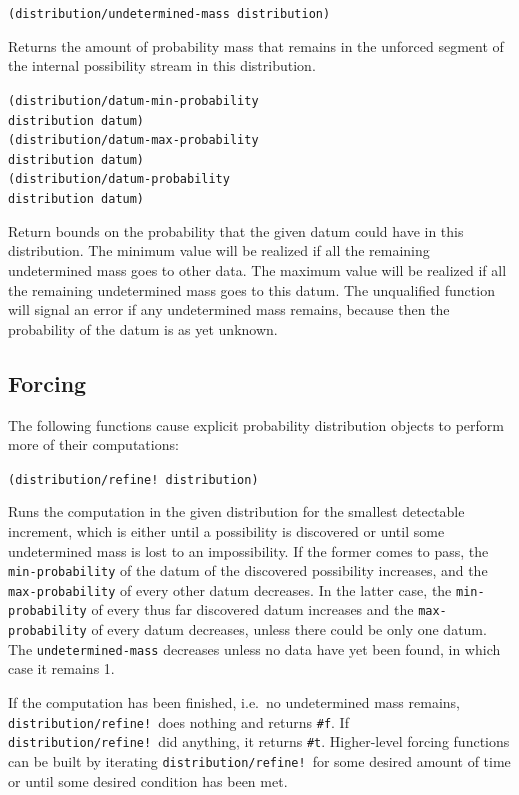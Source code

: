\documentclass[10pt]{sigplanconf}
\newcommand{\code}[1]{\texttt{#1}}
\newenvironment{documentation}[1]{\vspace{5pt} \noindent \texttt{#1} \nopagebreak \begin{list}{}{\leftmargin 0.7cm}\item}{\end{list}}
\begin{document}
\begin{documentation}{(distribution/undetermined-mass distribution)}
Returns the amount of probability mass that remains in the unforced
segment of the internal possibility stream in this distribution.
\end{documentation}

\begin{documentation}{(distribution/datum-min-probability \\ \mbox{} distribution datum) \\
(distribution/datum-max-probability \\ \mbox{} distribution datum) \\
(distribution/datum-probability \\ \mbox{} distribution datum)}
Return bounds on the probability that the given datum could have in
this distribution.  The minimum value will be realized if all the
remaining undetermined mass goes to other data.  The maximum value
will be realized if all the remaining undetermined mass goes to this
datum.  The unqualified function will signal an error if any
undetermined mass remains, because then the probability of the
datum is as yet unknown.
\end{documentation}

\subsection{Forcing}

The following functions cause explicit probability distribution
objects to perform more of their computations:

\begin{documentation}{(distribution/refine!\ distribution)}
Runs the computation in the given distribution for the smallest
detectable increment, which is either until a possibility is
discovered or until some undetermined mass is lost to an
impossibility.  If the former comes to pass, the \code{min-probability} of the
datum of the discovered possibility increases, and the
\code{max-probability} of every other datum decreases.  In the latter
case, the \code{min-probability} of every thus far discovered datum increases
and the \code{max-probability} of every datum decreases, unless there
could be only one datum.  The \code{undetermined-mass} decreases
unless no data have yet been found, in which case it remains 1.

If the computation has been finished, i.e.\ no
undetermined mass remains, \code{distribution/refine!}\ does nothing
and returns \code{\#f}.  If \code{distribution/refine!}\ did
anything, it returns \code{\#t}.  Higher-level forcing functions can
be built by iterating \code{distribution/refine!}\ for some desired
amount of time or until some desired condition has been met.
\end{documentation}
\end{document}
